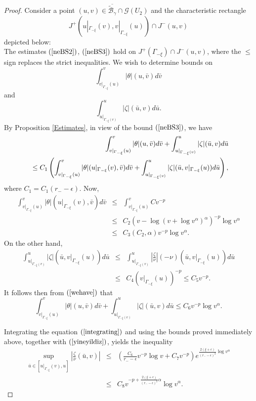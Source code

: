 \documentclass{article}
\newcommand{\zn}{\frac{\zeta}{\nu}}
\begin{document}
{\begin{proof}
Consider a point $(u,v)\in \overline{\tilde{\mathcal{B}}_\gamma}
\cap \mathcal{G}(U_2)$ and the 
characteristic rectangle 
\[
J^+(u|_{\Gamma_{-\xi}}(v),v|_{\Gamma_{-\xi}}(u))\cap J^-(u,v)
\]
depicted below:
\[

\]
The estimates $(\ref{neBS2})$, $(\ref{neBS3})$ hold on 
$J^+(\Gamma_{-\xi})\cap J^-(u,v)$, where
the $\le$ sign replaces the strict inequalities. 
We wish to determine bounds on 
\[
\int_{v|_{\Gamma_{-\xi}}(u)}^v{|\theta|(u,\bar{v})d\bar{v}}
\] 
and
\[
\int_{u|_{\Gamma_{-\xi}(v)}}^u{|\zeta|(\bar{u},v)d\bar{u}}. 
\]
By Proposition \ref{Estimates}, in view
of the bound $(\ref{neBS3})$,
we have
\begin{eqnarray}
\label{wehave}
\int_{v|_{\Gamma_{-\xi}}(u)}^v{|\theta|(u,\bar{v})d\bar{v}}
+\int_{u|_{\Gamma_{-\xi}(v)}}^u{|\zeta|(\bar{u},v)d\bar{u}}
\\
\nonumber
\hbox{\ }\le C_1
\left(\int_{v|_{\Gamma_{-\xi}}(u)}^v{|\theta|(u|_{\Gamma_{-\xi}}(v)
,\bar{v})d\bar{v}}
+\int_{u|_{\Gamma_{-\xi}(v)}}^u{|\zeta|(\bar{u},v|_{\Gamma_{-\xi}}(u))d\bar{u}}\right),
\end{eqnarray}
where $C_1=C_1(r_--\epsilon)$.
Now,
\begin{eqnarray*}
\int_{v|_{\Gamma_{-\xi}}(u)}^v{|\theta|(u|_{\Gamma_{-\xi}}(v)
,\bar{v})d\bar{v}}&\le&\int_{v|_{\Gamma_{-\xi}}(u)}^v{Cv^{-p}}\\
&\le& C_2(v-\log{(v+\log v^\alpha)^\alpha})^{-p}\log{v^\alpha}\\
&\le& 
C_3(C_2,\alpha)v^{-p}\log v^\alpha.
\end{eqnarray*}
On the other hand, 
\begin{eqnarray*}
\int_{u|_{\Gamma_{-\xi}(v)}}^u{|\zeta|(\bar{u},v|_{\Gamma_{-\xi}}(u))d\bar{u}}
&\le&
\int_{u|_{\Gamma_{-\xi}(v)}}^u{\left|\zn\right|(-\nu)
(\bar{u},v|_{\Gamma_{-\xi}}(u))d\bar{u}}\\
&\le& C_4\left(v|_{\Gamma_{-\xi}}(u)\right)^{-p}\le C_5v^{-p}.
\end{eqnarray*}
It follows then from $(\ref{wehave})$
that 
\begin{equation}
\label{KAIauto}
\int_{v|_{\Gamma_{-\xi}}(u)}^v{|\theta|(u,\bar{v})d\bar{v}}
+\int_{u|_{\Gamma_{-\xi}(v)}}^u{|\zeta|(\bar{u},v)d\bar{u}}
\le
C_6v^{-p}\log v^\alpha.
\end{equation}

Integrating the equation $(\ref{integrating})$ and using the bounds 
proved immediately above, together with $(\ref{yineyildiz})$,
yields the inequality
\begin{eqnarray}
\label{exeiakoma}
\nonumber
\sup_{\bar{u}\in\left[u|_{\Gamma_{-\xi}}(v),u\right]}\left|\zn(\bar{u},v)\right|
&\le& \left(\frac{C_6}{r_--\epsilon}
v^{-p}\log v+C_7v^{-p}\right)e^{\frac{2(\xi+\epsilon)}{(r_--\epsilon)^2}
\log v^\alpha}\\
&\le& C_8v^{-p+\frac{2(\xi+\epsilon)}{(r_--\epsilon)^2}\alpha}
\log v^\alpha.
\end{eqnarray}


\end{proof}}
\end{document}
